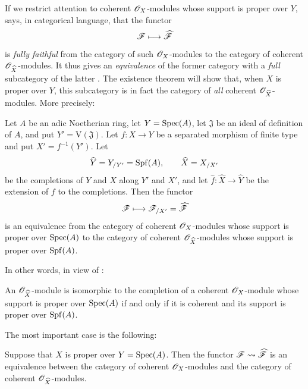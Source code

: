 If we restrict attention to coherent $\mathscr{O}_X$-modules whose
support is proper over $Y$,  says, in categorical
language, that the functor
\[
  \mathscr{F}\longmapsto\widehat{\mathscr{F}}
\]
is \emph{fully faithful} from the category of such $\mathscr{O}_X$-modules to
the category of coherent $\mathscr{O}_{\widehat{X}}$-modules.  It thus
gives an \emph{equivalence} of the former category with a \emph{full}
subcategory of the latter .  The existence theorem
will show that, when $X$ is proper over $Y$, this subcategory is in
fact the category of \emph{all} coherent
$\mathscr{O}_{\widehat{X}}$-modules.  More precisely:

\begin{theorem}[5.1.4]
\label{III.5.1.4}
Let $A$ be an adic Noetherian ring, let $Y=\operatorname{Spec}(A)$, let
$\mathfrak{J}$ be an ideal of definition of $A$, and put
$Y'=\mathrm{V}(\mathfrak{J})$.  Let $f:X\to Y$ be a separated
morphism of finite type and put $X'=f^{-1}(Y')$.  Let
\[
  \widehat{Y}=Y_{/Y'}=\operatorname{Spf}(A),\qquad
  \widehat{X}=X_{/X'}
\]
be the completions of $Y$ and $X$ along $Y'$ and $X'$, and let
$\widehat{f}:\widehat{X}\to\widehat{Y}$ be the extension of $f$ to
the completions.  Then the functor
\[
  \mathscr{F}\longmapsto\mathscr{F}_{/X'}=\widehat{\mathscr{F}}
\]
is an equivalence from the category of coherent
$\mathscr{O}_X$-modules whose support is proper over $\operatorname{Spec}(A)$ to the
category of coherent $\mathscr{O}_{\widehat{X}}$-modules whose support
is proper over $\operatorname{Spf}(A)$.
\end{theorem}

In other words, in view of :

\begin{corollary}[5.1.5]
\label{III.5.1.5}
An $\mathscr{O}_{\widehat{X}}$-module is isomorphic to the completion of
a coherent $\mathscr{O}_X$-module whose support is proper over
$\operatorname{Spec}(A)$ if and only if it is coherent and its support is proper
over $\operatorname{Spf}(A)$.
\end{corollary}

The most important case is the following:

\begin{corollary}[5.1.6]
\label{III.5.1.6}
Suppose that $X$ is proper over $Y=\operatorname{Spec}(A)$.  Then the functor
$\mathscr{F}\leadsto\widehat{\mathscr{F}}$ is an equivalence between the
category of coherent $\mathscr{O}_X$-modules and the category of
coherent $\mathscr{O}_{\widehat{X}}$-modules.
\end{corollary}

